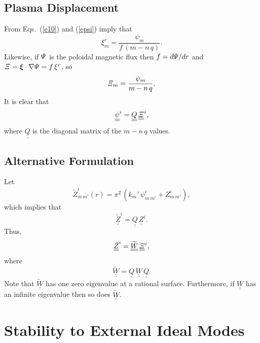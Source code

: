 \documentclass[12pt,prb,aps,notitlepage]{revtex4-1}
\newcommand{\bxi}{\mbox{\boldmath$\xi$}}
\begin{document}
\subsection{Plasma Displacement}
From Eqs.~(\ref{e10}) and (\ref{epsi}) imply that
\begin{equation}
\xi^r_m = \frac{\psi_m}{f\,(m-n\,q)}.
\end{equation}
Likewise, if ${\mit\Psi}$ is the poloidal magnetic flux then $f=d{\mit\Psi}/dr$ and ${\mit\Xi}=\bxi\cdot\nabla{\mit\Psi}= f\,\xi^r$, so
\begin{equation}
{\mit\Xi}_m = \frac{\psi_m}{m-n\,q}.
\end{equation}
It is clear that
\begin{equation}
\underline{\underline{\psi}}^i = \underline{\underline{Q}}\,\underline{\underline{\mit\Xi}}^i,
\end{equation}
where $\underline{\underline{Q}}$ is the diagonal matrix of the $m-n\,q$ values. 

\subsection{Alternative Formulation}
Let
\begin{equation}
\tilde{Z}^i_{m\,m'}(r) = \pi^2\,(k_{m}'\,\psi^i_{m\,m'}+Z_{m\,m'}^i),
\end{equation}
which implies that
\begin{equation}
\underline{\underline{\tilde{Z}}}^i = \underline{\underline{Q}}\,\underline{\underline{Z}}^i.
\end{equation}
Thus,
\begin{equation}
\underline{\underline{\tilde{Z}}}^i= \underline{\underline{\widetilde{W}}}\,\underline{\underline{\mit\Xi}}^i,
\end{equation}
where
\begin{equation}
\underline{\underline{\widetilde{W}}}= \underline{\underline{Q}}\,\underline{\underline{W}}\,\underline{\underline{Q}}.
\end{equation}
Note that $\underline{\underline{\widetilde{W}}}$ has one zero eigenvalue at a rational surface. Furthermore, if
$\underline{\underline{W}}$ has an infinite eigenvalue then so does $\underline{\underline{\widetilde{W}}}$.

\section{Stability to External Ideal Modes}
\end{document}
